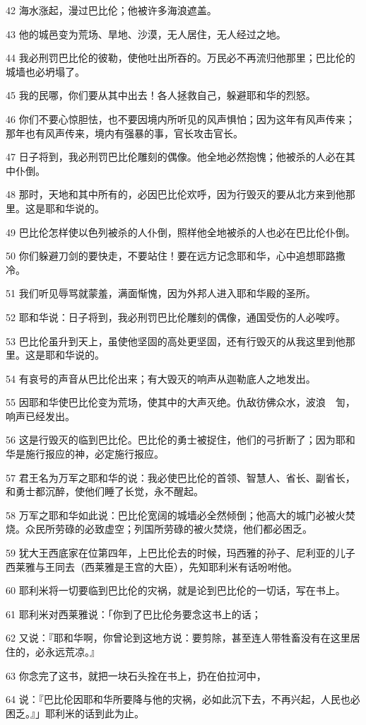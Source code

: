 \par 42 海水涨起，漫过巴比伦；他被许多海浪遮盖。
\par 43 他的城邑变为荒场、旱地、沙漠，无人居住，无人经过之地。
\par 44 我必刑罚巴比伦的彼勒，使他吐出所吞的。万民必不再流归他那里；巴比伦的城墙也必坍塌了。
\par 45 我的民哪，你们要从其中出去！各人拯救自己，躲避耶和华的烈怒。
\par 46 你们不要心惊胆怯，也不要因境内所听见的风声惧怕；因为这年有风声传来；那年也有风声传来，境内有强暴的事，官长攻击官长。
\par 47 日子将到，我必刑罚巴比伦雕刻的偶像。他全地必然抱愧；他被杀的人必在其中仆倒。
\par 48 那时，天地和其中所有的，必因巴比伦欢呼，因为行毁灭的要从北方来到他那里。这是耶和华说的。
\par 49 巴比伦怎样使以色列被杀的人仆倒，照样他全地被杀的人也必在巴比伦仆倒。
\par 50 你们躲避刀剑的要快走，不要站住！要在远方记念耶和华，心中追想耶路撒冷。
\par 51 我们听见辱骂就蒙羞，满面惭愧，因为外邦人进入耶和华殿的圣所。
\par 52 耶和华说：日子将到，我必刑罚巴比伦雕刻的偶像，通国受伤的人必唉哼。
\par 53 巴比伦虽升到天上，虽使他坚固的高处更坚固，还有行毁灭的从我这里到他那里。这是耶和华说的。
\par 54 有哀号的声音从巴比伦出来；有大毁灭的响声从迦勒底人之地发出。
\par 55 因耶和华使巴比伦变为荒场，使其中的大声灭绝。仇敌彷佛众水，波浪　訇，响声已经发出。
\par 56 这是行毁灭的临到巴比伦。巴比伦的勇士被捉住，他们的弓折断了；因为耶和华是施行报应的神，必定施行报应。
\par 57 君王名为万军之耶和华的说：我必使巴比伦的首领、智慧人、省长、副省长，和勇士都沉醉，使他们睡了长觉，永不醒起。
\par 58 万军之耶和华如此说：巴比伦宽阔的城墙必全然倾倒；他高大的城门必被火焚烧。众民所劳碌的必致虚空；列国所劳碌的被火焚烧，他们都必困乏。
\par 59 犹大王西底家在位第四年，上巴比伦去的时候，玛西雅的孙子、尼利亚的儿子西莱雅与王同去（西莱雅是王宫的大臣），先知耶利米有话吩咐他。
\par 60 耶利米将一切要临到巴比伦的灾祸，就是论到巴比伦的一切话，写在书上。
\par 61 耶利米对西莱雅说：「你到了巴比伦务要念这书上的话；
\par 62 又说：『耶和华啊，你曾论到这地方说：要剪除，甚至连人带牲畜没有在这里居住的，必永远荒凉。』
\par 63 你念完了这书，就把一块石头拴在书上，扔在伯拉河中，
\par 64 说：『巴比伦因耶和华所要降与他的灾祸，必如此沉下去，不再兴起，人民也必困乏。』」耶利米的话到此为止。

